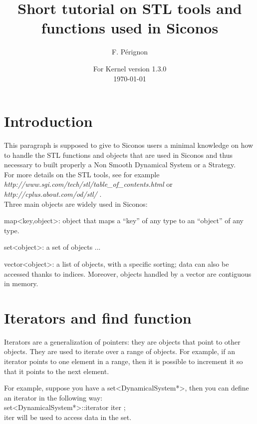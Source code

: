 \documentclass[10pt]{article}
\begin{document}
\thispagestyle{empty}
\title{Short tutorial on STL tools and functions used in Siconos}
\author{F. P\'erignon}

\date{For Kernel version 1.3.0 \\
 \today}
\maketitle

\pagestyle{fancy}

\section{Introduction}
This paragraph is supposed to give to Siconos users a minimal knowledge on how to handle the STL functions and objects that are used in Siconos and thus necessary
to built properly a Non Smooth Dynamical System or a Strategy. \\
For more details on the STL tools, see for example \textit{http://www.sgi.com/tech/stl/table\_of\_contents.html} or \textit{ http://cplus.about.com/od/stl/ }. \\
Three main objects are widely used in Siconos:
\bei
\item map<key,object>: object that maps a ``key'' of any type to an ``object'' of any type. 
\item set<object>: a set of objects ...
\item vector<object>: a list of objects, with a specific sorting; data can also be accessed thanks to indices. Moreover, objects handled by a vector are contiguous in memory.
\ei

\section{Iterators and find function}\label{ItAndFind}

Iterators are a generalization of pointers: they are objects that point to other objects. They are used to iterate over a range of objects.
For example, if an iterator points to one element in a range, then it is possible to increment it so that it points to the next element. 

For example, suppose you have a set<DynamicalSystem*>, then you can define an iterator in the following way: \\
set<DynamicalSystem*>::iterator iter ; \\
iter will be used to access data in the set. \\
\end{document}
